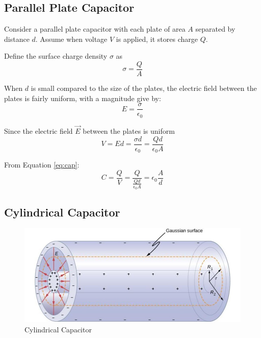 \documentclass[14pt]{memoir}
\begin{document}
\subsection{Parallel Plate Capacitor}
Consider a parallel plate capacitor with each plate of area $A$ separated by distance $d$. Assume when voltage $V$ is applied, it stores charge $Q$. 

Define the surface charge density $\sigma$ as
\begin{equation}
\sigma = \frac{Q}{A}
\end{equation}

When $d$ is small compared to the size of the plates, the electric field between the plates is fairly uniform, with a magnitude give by:
\begin{equation}
E = \frac{\sigma}{\epsilon_0}
\end{equation}

Since the electric field $\vec{E}$ between the plates is uniform
\begin{equation}
V = Ed = \frac{\sigma d}{\epsilon_0} = \frac{Q d}{\epsilon_0 A}
\end{equation}

From Equation \ref{eq:cap}:
\begin{equation}
C = \frac{Q}{V} = \frac{Q}{\frac{Q d}{\epsilon_0 A}} = \epsilon_0 \frac{A}{d}
\label{eq:qv}
\end{equation}

\subsection{Cylindrical Capacitor}

\begin{figure}[H]
\begin{center}
\includegraphics[scale=0.50]{fig/fig_08_07.jpg}
\caption{Cylindrical Capacitor}
\label{fig:08_07}
\end{center}
\end{figure}
\end{document}
